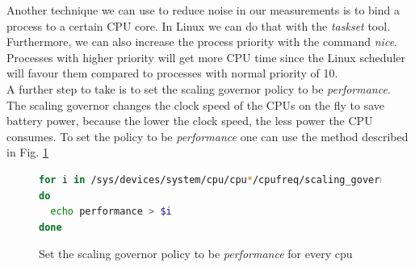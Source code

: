 Another technique we can use to reduce noise in our measurements is  to bind a process to a certain CPU core. In Linux we can do that with the \textit{taskset} tool. \cite{LinuxManualWeb}\\
Furthermore, we can also increase the process priority with the command \textit{nice}. Processes with higher priority will get more CPU time since the Linux scheduler will favour them compared to processes with normal priority of 10. \cite{LinuxManualWeb}\\
A further step to take is to set the scaling governor policy to be \textit{performance}. The scaling governor changes the clock speed of the CPUs on the fly to save battery power, because the lower the clock speed, the less power the CPU consumes. To set the policy to be \textit{performance} one can use the method described in Fig. \ref{fig:per_sca}
\begin{figure}[h]
\begin{lstlisting}[language=bash]
for i in /sys/devices/system/cpu/cpu*/cpufreq/scaling_governor
do
  echo performance > $i
done
\end{lstlisting}
\caption{Set the scaling governor policy to be \textit{performance} for every cpu}
\label{fig:per_sca}
\end{figure}



